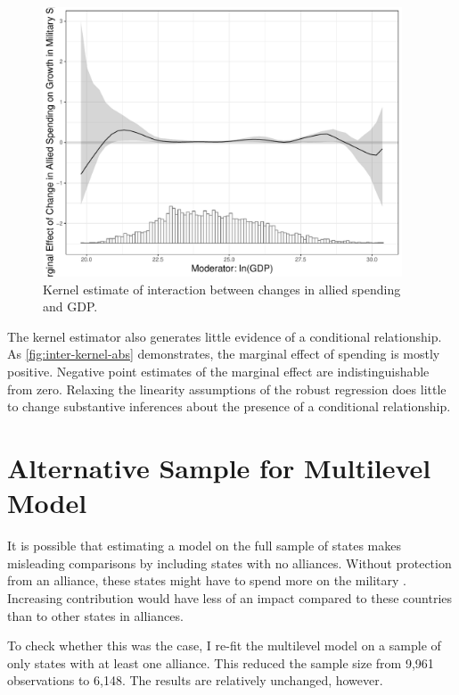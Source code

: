 \documentclass[12pt]{article}
\begin{document}
\begin{figure}
	\centering
		\includegraphics[width=0.95\textwidth]{inter-kernel-abs.pdf}
	\caption{Kernel estimate of interaction between changes in allied spending and GDP.}
	\label{fig:inter-kernel-abs}
\end{figure}


The kernel estimator also generates little evidence of a conditional relationship. 
As \autoref{fig:inter-kernel-abs} demonstrates, the marginal effect of spending is mostly positive. 
Negative point estimates of the marginal effect are indistinguishable from zero. 
Relaxing the linearity assumptions of the robust regression does little to change substantive inferences about the presence of a conditional relationship. 




\section{Alternative Sample for Multilevel Model}


It is possible that estimating a model on the full sample of states makes misleading comparisons by including states with no alliances.
Without protection from an alliance, these states might have to spend more on the military \citep{Morrow1993}. 
Increasing contribution would have less of an impact compared to these countries than to other states in alliances. 


To check whether this was the case, I re-fit the multilevel model on a sample of only states with at least one alliance. 
This reduced the sample size from 9,961 observations to 6,148. 
The results are relatively unchanged, however. 
\end{document}

